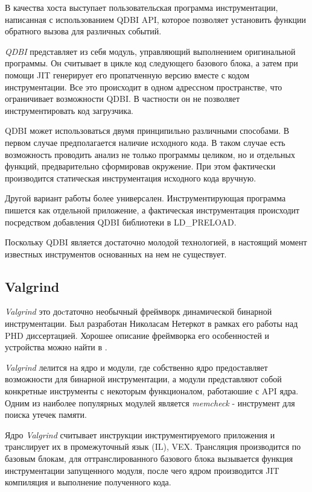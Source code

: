 В качества хоста выступает пользовательская программа инструментации, написанная с использованием QDBI API, которое позволяет установить функции обратного вызова для различных событий.

\emph{QDBI} представляет из себя модуль, управляющий выполнением оригинальной программы. Он считывает в цикле код следующего базового блока, а затем при помощи JIT генерирует его пропатченную версию вместе с кодом инструментации. Все это происходит в одном адрессном пространстве, что ограничивает возможности QDBI. В частности он не позволяет инструментировать код загрузчика.

QDBI может использоваться двумя принципильно различными способами. В первом случае предполагается наличие исходного кода. В таком случае есть возможность проводить анализ не только программы целиком, но и отдельных функций, предварительно сформировав окружение. При этом фактически производится статическая инструментация исходного кода вручную.

Другой вариант работы более универсален. Инструментирующая программа пишется как отдельной приложение, а фактическая инструментация происходит посредством добавления QDBI библиотеки в LD\_PRELOAD.

Поскольку QDBI является достаточно молодой технологией, в настоящий момент известных инструментов основанных на нем не существует.


\subsection{Valgrind}

\emph{Valgrind} это доcтаточно необычный фреймворк динамической бинарной инструментации. Был разработан Николасам Нетеркот в рамках его работы над PHD диссертацией. Хорошее описание фреймворка его особенностей и устройства можно найти в \cite{VALGRIND}.


\emph{Valgrind} лелится на ядро и модули, где собственно ядро предоставляет возможности для бинарной инструментации, а модули представляют собой конкретные инструменты с некоторым функционалом, работаюшие с API ядра. Одним из наиболее популярных модулей является \emph{memcheck} - инструмент для поиска утечек памяти.

Ядро \emph{Valgrind} считывает инструкции инструментируемого приложения и транслирует их в промежуточный язык (IL), VEX. Трансляция производится по базовым блокам, для оттранслированного базового блока вызывается функция инструментации запущенного модуля, после чего ядром производится JIT компиляция и выполнение полученного кода.

